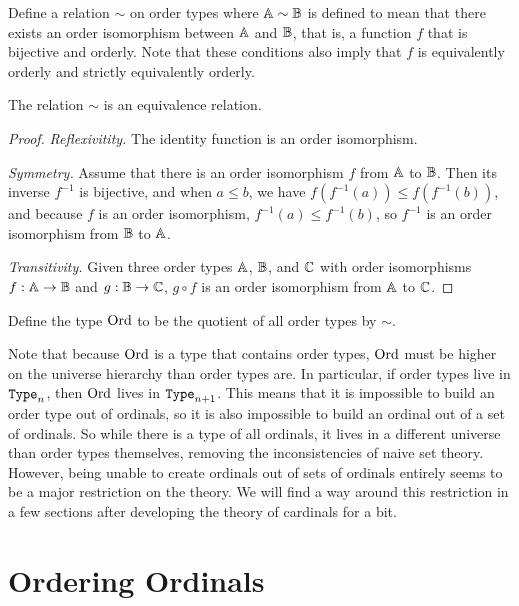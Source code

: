 \documentclass[../../math.tex]{subfiles}
\begin{document}
\begin{definition}
    Define a relation $\sim$ on order types where $\mathbb{A} \sim \mathbb{B}$ is defined to
    mean that there exists an order isomorphism between $\mathbb{A}$ and $\mathbb{B}$, that is,
    a function $f$ that is bijective and orderly.  Note that these conditions
    also imply that $f$ is equivalently orderly and strictly equivalently
    orderly.
\end{definition}

\begin{lemma}
    The relation $\sim$ is an equivalence relation.
\end{lemma}
\begin{proof}
    \textit{Reflexivitity.}  The identity function is an order isomorphism.

    \textit{Symmetry.}  Assume that there is an order isomorphism $f$ from $\mathbb{A}$
    to $\mathbb{B}$.  Then its inverse $f^{-1}$ is bijective, and when $a \leq b$, we
    have $f(f^{-1}(a)) \leq f(f^{-1}(b))$, and because $f$ is an order
    isomorphism, $f^{-1}(a) \leq f^{-1}(b)$, so $f^{-1}$ is an order isomorphism
    from $\mathbb{B}$ to $\mathbb{A}$.

    \textit{Transitivity.}  Given three order types $\mathbb{A}$, $\mathbb{B}$, and $\mathbb{C}$ with
    order isomorphisms $f : \mathbb{A} \to \mathbb{B}$ and $g : \mathbb{B} \to \mathbb{C}$, $g \circ f$ is an
    order isomorphism from $\mathbb{A}$ to $\mathbb{C}$.
\end{proof}

\begin{definition}
    Define the type $\operatorname{Ord}$ to be the quotient of all order types by $\sim$.
\end{definition}

Note that because $\operatorname{Ord}$ is a type that contains order types, $\operatorname{Ord}$ must be
higher on the universe hierarchy than order types are.  In particular, if order
types live in $\Type_n$, then $\operatorname{Ord}$ lives in $\Type_{n+1}$.  This means that it
is impossible to build an order type out of ordinals, so it is also impossible
to build an ordinal out of a set of ordinals.  So while there is a type of all
ordinals, it lives in a different universe than order types themselves, removing
the inconsistencies of naive set theory.  However, being unable to create
ordinals out of sets of ordinals entirely seems to be a major restriction on the
theory.  We will find a way around this restriction in a few sections after
developing the theory of cardinals for a bit.

\section{Ordering Ordinals}
\end{document}
